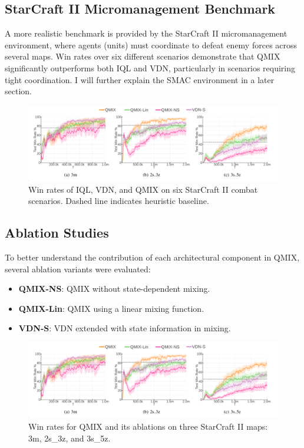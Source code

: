 \documentclass[../Main.tex]{subfiles}
\begin{document}
\subsection{StarCraft II Micromanagement Benchmark}

A more realistic benchmark is provided by the StarCraft II micromanagement environment, where agents (units) must coordinate to defeat enemy forces across several maps. Win rates over six different scenarios demonstrate that QMIX significantly outperforms both IQL and VDN, particularly in scenarios requiring tight coordination. I will further explain the SMAC environment in a later section.

\begin{figure}[h]
    \centering
    \includegraphics[width=\linewidth]{img/results/abblations.png}
    \caption{Win rates of IQL, VDN, and QMIX on six StarCraft II combat scenarios. Dashed line indicates heuristic baseline.}
    \label{fig:starcraft}
\end{figure}

\subsection{Ablation Studies}

To better understand the contribution of each architectural component in QMIX, several ablation variants were evaluated:
\begin{itemize}
    \item \textbf{QMIX-NS}: QMIX without state-dependent mixing.
    \item \textbf{QMIX-Lin}: QMIX using a linear mixing function.
    \item \textbf{VDN-S}: VDN extended with state information in mixing.
\end{itemize}

\begin{figure}[h]
    \centering
    \includegraphics[width=1\linewidth]{img/results/abblations.png}
    \caption{Win rates for QMIX and its ablations on three StarCraft II maps: 3m, 2s\_3z, and 3s\_5z.}
    \label{fig:abblations}
\end{figure}
\end{document}
